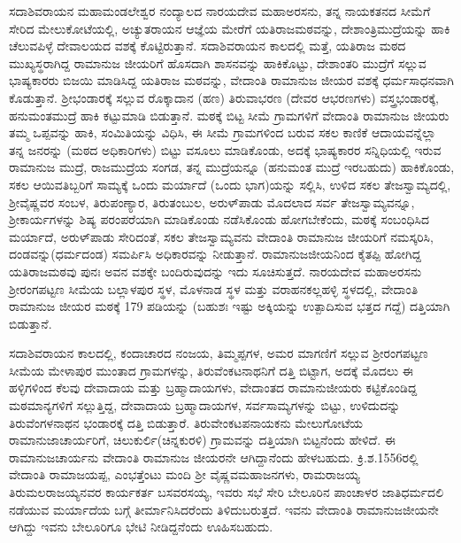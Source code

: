ಸದಾಶಿವರಾಯನ ಮಹಾಮಂಡಲೇಶ್ವರ ನಂದ್ಯಾಲದ ನಾರಯದೇವ ಮಹಾಅರಸನು, ತನ್ನ ನಾಯಕತನದ ಸೀಮೆಗೆ ಸೇರಿದ ಮೇಲುಕೋಟೆಯಲ್ಲಿ, ಅಚ್ಯುತರಾಯನ ಆಜ್ಞೆಯ ಮೇರೆಗೆ ಯತಿರಾಜಮಠವನ್ನು, ದೇಶಾಂತ್ರಿಮುದ್ರೆಯನ್ನು ಹಾಕಿ ಚೆಲುವಪಿಳ್ಳೆ ದೇವಾಲಯದ ವಶಕ್ಕೆ ಕೊಟ್ಟಿರುತ್ತಾನೆ. ಸದಾಶಿವರಾಯನ ಕಾಲದಲ್ಲಿ ಮತ್ತೆ, ಯತಿರಾಜ ಮಠದ ಮುಖ್ಯಸ್ಥರಾಗಿದ್ದ ರಾಮಾನುಜ ಜೀಯರಿಗೆ ಹೊಸದಾಗಿ ಶಾಸನವನ್ನು ಹಾಕಿಕೊಟ್ಟು, ದೇಶಾಂತರಿ ಮುದ್ರೆಗೆ ಸಲ್ಲುವ ಭಾಷ್ಯಕಾರರು ಬಿಜಯಿ ಮಾಡಿಸಿದ್ದ ಯತಿರಾಜ ಮಠವನ್ನು, ವೇದಾಂತಿ ರಾಮಾನುಜ ಜೀಯರ ವಶಕ್ಕೆ ಧರ್ಮಸಾಧನವಾಗಿ ಕೊಡುತ್ತಾನೆ. ಶ‍್ರೀಭಂಡಾರಕ್ಕೆ ಸಲ್ಲುವ ರೊಕ್ಕಾದಾನ (ಹಣ) ತಿರುವಾಭರಣ (ದೇವರ ಆಭರಣಗಳು) ವಸ್ತ್ರಭಂಡಾರಕ್ಕೆ, ಹನುಮಂತಮುದ್ರೆ ಹಾಕಿ ಕಟ್ಟುಮಾಡಿ ಬಿಡುತ್ತಾನೆ. ಮಠಕ್ಕೆ ಬಿಟ್ಟ ಸೀಮೆ ಗ್ರಾಮಗಳಿಗೆ ವೇದಾಂತಿ ರಾಮಾನುಜ ಜೀಯರು ತಮ್ಮ ಒಪ್ಪವನ್ನು ಹಾಕಿ, ಸಂಮಿತಿಯನ್ನು ವಿಧಿಸಿ, ಈ ಸೀಮೆ ಗ್ರಾಮಗಳಿಂದ ಬರುವ ಸಕಲ ಕಾಣಿಕೆ ಆದಾಯವನ್ನೆಲ್ಲಾ ತನ್ನ ಜನರನ್ನು (ಮಠದ ಅಧಿಕಾರಿಗಳು) ಬಿಟ್ಟು ವಸೂಲು ಮಾಡಿಕೊಂಡು, ಅದಕ್ಕೆ ಭಾಷ್ಯಕಾರರ ಸನ್ನಿಧಿಯಲ್ಲಿ ಇರುವ ರಾಮಾನುಜ ಮುದ್ರೆ, ರಾಜಮುದ್ರೆಯ ಸಂಗಡ, ತನ್ನ ಮುದ್ರೆಯನ್ನೂ (ಹನುಮಂತ ಮುದ್ರೆ ಇರಬಹುದು) ಹಾಕಿಕೊಂಡು, ಸಕಲ ಆಯಿವತಿಬ್ಬರಿಗೆ ಸಾಮ್ಯಕ್ಕೆ ಒಂದು ಮರ್ಯಾದೆ (ಒಂದು ಭಾಗ)ಯನ್ನು ಸಲ್ಲಿಸಿ, ಉಳಿದ ಸಕಲ ತೇಜಸ್ವಾಮ್ಯದಲ್ಲಿ, ಶ‍್ರೀವೈಷ್ಣವರ ಸಂಬಳ, ತಿರುಪಂಣ್ಯಾರ, ತಿರುತಂಬುಲ, ಅರುಳ್​ಪಾಡು ಮೊದಲಾದ ಸರ್ವ ತೇಜಸ್ವಾಮ್ಯವನ್ನೂ, ಶ‍್ರೀಕಾರ್ಯಗಳನ್ನು ಶಿಷ್ಯ ಪರಂಪರೆಯಾಗಿ ಮಾಡಿಕೊಂಡು ನಡೆಸಿಕೊಂಡು ಹೋಗಬೇಕೆಂದು, ಮಠಕ್ಕೆ ಸಂಬಂಧಿಸಿದ ಮರ್ಯಾದೆ, ಅರುಳ್​ಪಾಡು ಸೇರಿದಂತೆ, ಸಕಲ ತೇಜಸ್ವಾಮ್ಯವನು ವೇದಾಂತಿ ರಾಮಾನುಜ ಜೀಯರಿಗೆ ನಮಸ್ಕರಿಸಿ, ದಂಡವನ್ನು(ಧರ್ಮದಂಡ) ಸಮರ್ಪಿಸಿ ಅಧಿಕಾರವನ್ನು ನೀಡುತ್ತಾನೆ. ರಾಮಾನುಜಜೀಯನಿಂದ ಕೈತಪ್ಪಿ ಹೋಗಿದ್ದ ಯತಿರಾಜಮಠವು ಪುನಃ ಅವನ ವಶಕ್ಕೇ ಬಂದಿರುವುದನ್ನು ಇದು ಸೂಚಿಸುತ್ತದೆ. ನಾರಯದೇವ ಮಹಾಅರಸನು ಶ‍್ರೀರಂಗಪಟ್ಟಣ ಸೀಮೆಯ ಬಲ್ಲಾಳಪುರ ಸ್ಥಳ, ಮೊಳನಾಡ ಸ್ಥಳ ಮತ್ತು ವರಾಹನಕಲ್ಲಹಳ್ಳಿ ಸ್ಥಳದಲ್ಲಿ, ವೇದಾಂತಿ ರಾಮಾನುಜ ಜೀಯರ ಮಠಕ್ಕೆ 179 ಪಡಿಯನ್ನು (ಬಹುಶಃ ಇಷ್ಟು ಅಕ್ಕಿಯನ್ನು ಉತ್ಪಾದಿಸುವ ಭತ್ತದ ಗದ್ದೆ) ದತ್ತಿಯಾಗಿ ಬಿಡುತ್ತಾನೆ.

ಸದಾಶಿವರಾಯನ ಕಾಲದಲ್ಲಿ, ಕಂದಾಚಾರದ ನಂಜಯ, ತಿಮ್ಮಪ್ಪಗಳ, ಅಮರ ಮಾಗಣಿಗೆ ಸಲ್ಲುವ ಶ‍್ರೀರಂಗಪಟ್ಟಣ ಸೀಮೆಯ ಮೇಳಾಪುರ ಮುಂತಾದ ಗ್ರಾಮಗಳನ್ನು, ತಿರುವೆಂಕಟನಾಥನಿಗೆ ದತ್ತಿ ಬಿಟ್ಟಾಗ, ಅದಕ್ಕೆ ಮೊದಲು ಈ ಹಳ್ಳಿಗಳಿಂದ ಕೆಲವು ದೇವಾದಾಯ ಮತ್ತು ಬ್ರಹ್ಮಾದಾಯಗಳು, ವೇದಾಂತದ ರಾಮಾನುಜೀಯರು ಕಟ್ಟಿಕೊಂಡಿದ್ದ ಮಠಮಾನ್ಯಗಳಿಗೆ ಸಲ್ಲುತ್ತಿದ್ದ, ದೇವಾದಾಯ ಬ್ರಹ್ಮಾದಾಯಗಳ, ಸರ್ವಸಾಮ್ಯಗಳನ್ನು ಬಿಟ್ಟು, ಉಳಿದುದನ್ನು ತಿರುವೆಂಗಳನಾಥನ ಭಂಡಾರಕ್ಕೆ ದತ್ತಿ ಬಿಡುತ್ತಾರೆ. ತಿರುವೇಂಕಟಪನಾಯಕನು ಮೇಲುಗೋಟೆಯ ರಾಮಾನುಜಾಚಾರ್ಯರಿಗೆ, ಚಿಲುಕುರ್ಲಿ(ಚಿನ್ನಕುರಳಿ) ಗ್ರಾಮವನ್ನು ದತ್ತಿಯಾಗಿ ಬಿಟ್ಟನೆಂದು ಹೇಳಿದೆ. ಈ ರಾಮಾನುಜಚಾರ್ಯನು ವೇದಾಂತಿ ರಾಮಾನುಜ ಜೀಯರನೇ ಆಗಿದ್ದಾನೆಂದು ಹೇಳಬಹುದು. ಕ್ರಿ.ಶ.1556ರಲ್ಲಿ ವೇದಾಂತಿ ರಾಮಾಜಯಪ್ಪ, ಎಂಭತ್ತೆಂಟು ಮಂದಿ ಶ‍್ರೀ ವೈಷ್ಣವಮಹಾಜನ\-ಗಳು, ರಾಮರಾಜಯ್ಯ ತಿರುಮಲರಾಜಯ್ಯನವರ ಕಾರ್ಯಕರ್ತ ಬಸವರಸಯ್ಯ, ಇವರು ಸಭೆ ಸೇರಿ ಬೇಲೂರಿನ ಪಾಂಚಾಳರ ಜಾತಿಧರ್ಮದಲಿ ನಡೆಯುವ ಮರ್ಯಾದೆಯ ಬಗ್ಗೆ ತೀರ್ಮಾನಿಸಿದರೆಂದು ತಿಳಿದುಬರುತ್ತದೆ. ಇವನು ವೇದಾಂತಿ ರಾಮಾನುಜಜೀಯನೇ ಆಗಿದ್ದು ಇವನು ಬೇಲೂರಿಗೂ ಭೇಟಿ ನೀಡಿದ್ದನೆಂದು ಊಹಿಸಬಹುದು.

